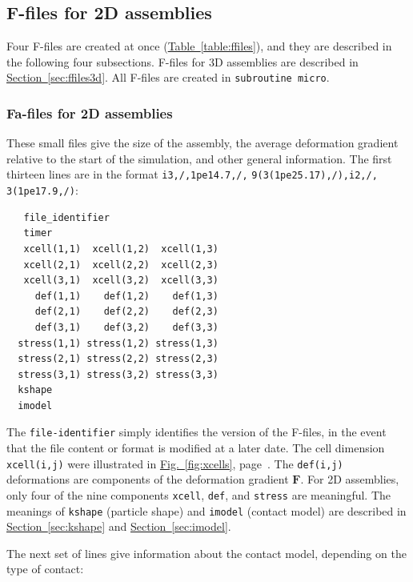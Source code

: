\documentclass[letterpaper,11pt]{article}
\begin{document}
\subsection{F-files for 2D assemblies}\label{sec:ffiles2d}
Four F-files are created at once
(\hyperref[table:ffiles]{Table~\ref*{table:ffiles}}),
and they are described in the following four subsections.
F-files for 3D assemblies are described in
\hyperref[sec:ffiles3d]{Section~\ref*{sec:ffiles3d}}.
All F-files are created in \texttt{subroutine micro}.
\subsubsection{Fa-files for 2D assemblies}\label{sec:f1files}
These small files give the size of the assembly, the 
average deformation gradient relative to the start of the simulation,
and other general information.
The first thirteen lines
are in the format \texttt{i3,/,}\texttt{1pe14.7,/,}
\texttt{9(3(1pe25.17),/),i2,/,}
\texttt{3(1pe17.9,/)}:
\begin{verbatim}
   file_identifier
   timer
   xcell(1,1)  xcell(1,2)  xcell(1,3)
   xcell(2,1)  xcell(2,2)  xcell(2,3)
   xcell(3,1)  xcell(3,2)  xcell(3,3)
     def(1,1)    def(1,2)    def(1,3)
     def(2,1)    def(2,2)    def(2,3)
     def(3,1)    def(3,2)    def(3,3)
  stress(1,1) stress(1,2) stress(1,3)
  stress(2,1) stress(2,2) stress(2,3)
  stress(3,1) stress(3,2) stress(3,3)
  kshape
  imodel
\end{verbatim}
The \texttt{file-identifier} simply identifies the version of the F-files,
in the event that the file content or format is modified at a later date.
The cell dimension \texttt{xcell(i,j)} were illustrated in
\hyperref[fig:xcells]{Fig.~\ref*{fig:xcells}},
page~\pageref{fig:xcells}.
The \texttt{def(i,j)} deformations are components of the
deformation gradient $\mathbf{F}$.
For 2D assemblies,
only four of the nine components 
\texttt{xcell}, \texttt{def}, and \texttt{stress} are meaningful.
The meanings of \texttt{kshape} (particle shape)
and \texttt{imodel} (contact model)
are described in 
\hyperref[sec:kshape]{Section~\ref*{sec:kshape}}
and \hyperref[sec:imodel]{Section~\ref*{sec:imodel}}.
\par
The next set of lines give information about the contact model,
depending on the type of contact:
\end{document}
